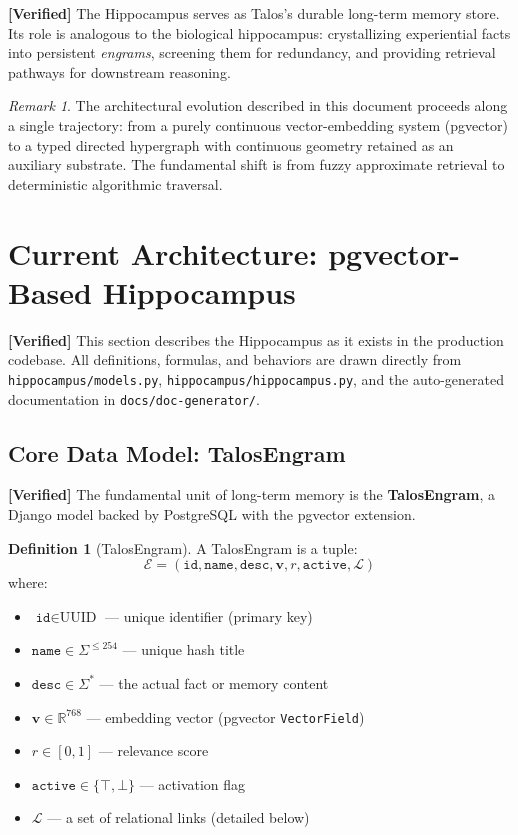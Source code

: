 \documentclass[11pt]{article}
\newcommand{\verified}{\textcolor{verifiedgreen}{\textbf{[Verified]}}}
\theoremstyle{definition}
\newtheorem{definition}{Definition}[section]
\theoremstyle{remark}
\newtheorem{remark}{Remark}[section]
\begin{document}
\noindent
\verified{} The Hippocampus serves as Talos's durable long-term memory store.
Its role is analogous to the biological hippocampus: crystallizing experiential
facts into persistent \emph{engrams}, screening them for redundancy, and
providing retrieval pathways for downstream reasoning.

\begin{remark}
The architectural evolution described in this document proceeds along a single
trajectory: from a purely continuous vector-embedding system (pgvector) to a
typed directed hypergraph with continuous geometry retained as an auxiliary
substrate. The fundamental shift is from fuzzy approximate retrieval to
deterministic algorithmic traversal.
\end{remark}

\section{Current Architecture: pgvector-Based Hippocampus}
\label{sec:current}

\verified{} This section describes the Hippocampus as it exists in the
production codebase. All definitions, formulas, and behaviors are drawn directly
from \texttt{hippocampus/models.py}, \texttt{hippocampus/hippocampus.py}, and
the auto-generated documentation in \texttt{docs/doc-generator/}.

\subsection{Core Data Model: TalosEngram}

\verified{} The fundamental unit of long-term memory is the \textbf{TalosEngram},
a Django model backed by PostgreSQL with the pgvector extension.

\begin{definition}[TalosEngram]
\label{def:engram}
A TalosEngram is a tuple:
\[
  \mathcal{E} = (\texttt{id}, \texttt{name}, \texttt{desc}, \mathbf{v},
  r, \texttt{active}, \mathcal{L})
\]
where:
\begin{itemize}[nosep]
  \item $\texttt{id} \in \text{UUID}$ --- unique identifier (primary key)
  \item $\texttt{name} \in \Sigma^{\leq 254}$ --- unique hash title
  \item $\texttt{desc} \in \Sigma^{*}$ --- the actual fact or memory content
  \item $\mathbf{v} \in \mathbb{R}^{768}$ --- embedding vector (pgvector \texttt{VectorField})
  \item $r \in [0, 1]$ --- relevance score
  \item $\texttt{active} \in \{\top, \bot\}$ --- activation flag
  \item $\mathcal{L}$ --- a set of relational links (detailed below)
\end{itemize}
\end{definition}
\end{document}
